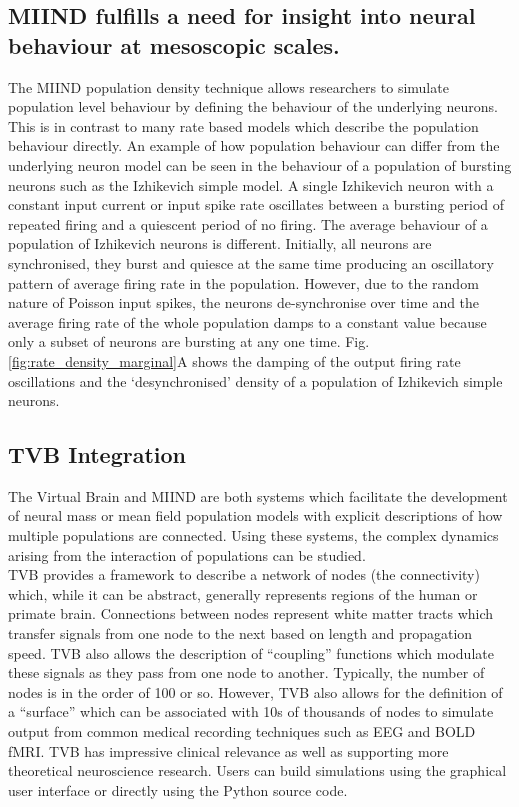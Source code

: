\documentclass[utf8]{frontiersSCNS} %
\begin{document}
\subsection*{MIIND fulfills a need for insight into neural behaviour at mesoscopic scales.}
The MIIND population density technique allows researchers to simulate population level behaviour by defining the behaviour of the underlying neurons. This is in contrast to many rate based models which describe the population behaviour directly. An example of how population behaviour can differ from the underlying neuron model can be seen in the behaviour of a population of bursting neurons such as the Izhikevich simple model. A single Izhikevich neuron with a constant input current or input spike rate oscillates between a bursting period of repeated firing and a quiescent period of no firing. The average behaviour of a population of Izhikevich neurons is different. Initially, all neurons are synchronised, they burst and quiesce at the same time producing an oscillatory pattern of average firing rate in the population. However, due to the random nature of Poisson input spikes, the neurons de-synchronise over time and the average firing rate of the whole population damps to a constant value because only a subset of neurons are bursting at any one time. Fig. \ref{fig:rate_density_marginal}A shows the damping of the output firing rate oscillations and the `desynchronised' density of a population of Izhikevich simple neurons.\\ 

\subsection*{TVB Integration}
\label{tvbintegration}
The Virtual Brain \citep{sanz2013virtual} and MIIND are both systems which facilitate the development of neural mass or mean field population models with explicit descriptions of how multiple populations are connected. Using these systems, the complex dynamics arising from the interaction of populations can be studied.\\ 
TVB provides a framework to describe a network of nodes (the connectivity) which, while it can be abstract, generally represents regions of the human or primate brain. Connections between nodes represent white matter tracts which transfer signals from one node to the next based on length and propagation speed. TVB also allows the description of ``coupling'' functions which modulate these signals as they pass from one node to another. Typically, the number of nodes is in the order of 100 or so. However, TVB also allows for the definition of a ``surface'' which can be associated with 10s of thousands of nodes to simulate output from common medical recording techniques such as EEG and BOLD fMRI. TVB has impressive clinical relevance as well as supporting more theoretical neuroscience research. Users can build simulations using the graphical user interface or directly using the Python source code.\\ 
\end{document}
